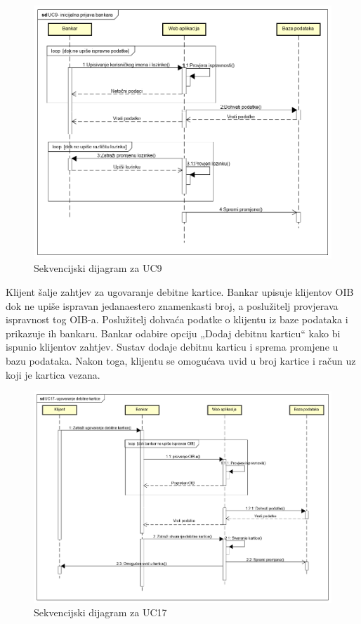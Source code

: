 				\begin{figure}[H]
					\includegraphics[scale=0.6]{slike/UC9- inicijalna prijava bankara.PNG}
					\centering
					\caption{Sekvencijski dijagram za UC9}
					\label{fig:uc9}
				\end{figure}
			\eject
			
			
			Klijent šalje zahtjev za ugovaranje debitne kartice. Bankar upisuje klijentov OIB dok ne upiše ispravan jedanaestero znamenkasti broj, a poslužitelj provjerava ispravnost tog OIB-a. Poslužitelj dohvaća podatke o klijentu iz baze podataka i prikazuje ih bankaru. Bankar odabire opciju „Dodaj debitnu karticu“ kako bi ispunio klijentov zahtjev. Sustav dodaje debitnu karticu i sprema promjene u bazu podataka. Nakon toga, klijentu se omogućava uvid u broj kartice i račun uz koji je kartica vezana.
			\eject
			
			\begin{figure}[H]
				\includegraphics[scale=0.5]{slike/UC17- ugovaranje debitne kartice.PNG}
				\centering
				\caption{Sekvencijski dijagram za UC17}
				\label{fig:uc17}
			\end{figure}
			\eject
			
